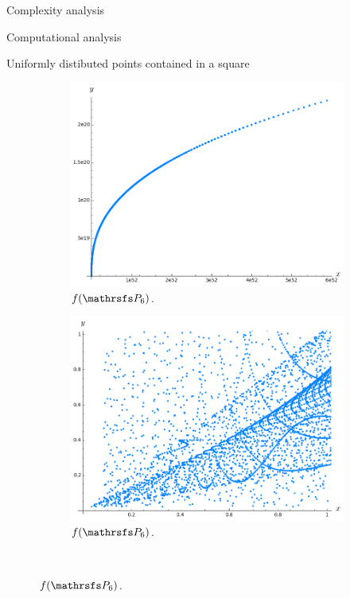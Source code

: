 \documentclass[11pt, a4paper, english, twoside, notitlepage, openright]{report}
\begin{document}
\begin{chapter}{Complexity analysis}
\begin{section}{Computational analysis}
\begin{subsection}{Uniformly distibuted points contained in a square}
\begin{figure}
\hspace{-0.1cm}
\begin{subfigure}{.49\linewidth}\centering
\includegraphics[width=1\textwidth]{plots/ch5_19_P6.png}
\vspace{0cm}\caption{$f(\PP_6)$.\label{fig:fP6_1}}
\end{subfigure}
\begin{subfigure}{.49\linewidth}\centering
\includegraphics[width=1\textwidth]{plots/ch5_20_P6prime.png}
\vspace{0cm}\caption{$f(\PP_6)$.\label{fig:fP6_2}}
\end{subfigure}\\[1ex]
\vspace{0.4cm}


\end{figure}
\end{subsection}
\end{section}
\end{chapter}
\end{document}
